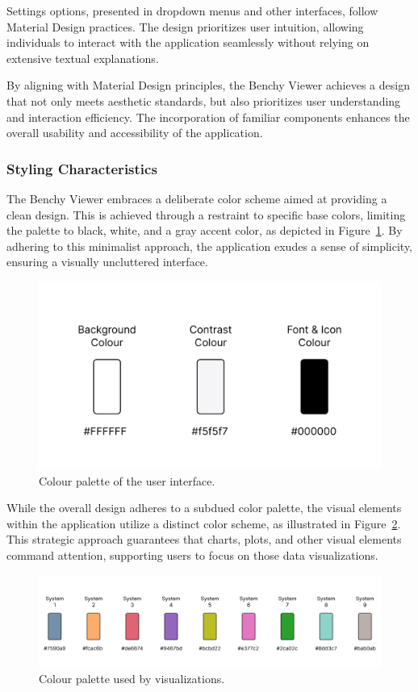 Settings options, presented in dropdown menus and other interfaces, follow Material Design practices. The design prioritizes user intuition, allowing individuals to interact with the application seamlessly without relying on extensive textual explanations.

By aligning with Material Design principles, the Benchy Viewer achieves a design that not only meets aesthetic standards, but also prioritizes user understanding and interaction efficiency. The incorporation of familiar components enhances the overall usability and accessibility of the application.


\subsubsection{Styling Characteristics}

The Benchy Viewer embraces a deliberate color scheme aimed at providing a clean design. This is achieved through a restraint to specific base colors, limiting the palette to black, white, and a gray accent color, as depicted in Figure~\ref{fig:colors}. By adhering to this minimalist approach, the application exudes a sense of simplicity, ensuring a visually uncluttered interface.



\begin{figure}[h]
  \centering
  \includegraphics[width=0.4\linewidth]{figures/colors.png}
  \caption{Colour palette of the user interface.}
  \label{fig:colors}
\end{figure}

While the overall design adheres to a subdued color palette, the visual elements within the application utilize a distinct color scheme, as illustrated in Figure~\ref{fig:colors-dbms}. This strategic approach guarantees that charts, plots, and other visual elements command attention, supporting users to focus on those data visualizations.

\begin{figure}[h]
  \centering
  \includegraphics[width=1\linewidth]{figures/colors-dbms.png}
  \caption{Colour palette used by visualizations.}
  \label{fig:colors-dbms}
\end{figure}

